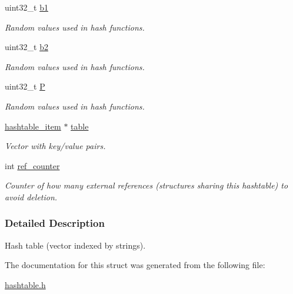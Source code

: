\begin{DoxyCompactItemize}
\mbox{\label{structhashtable__struct_a3d65fc5f5625a3c950ae177599c1a4dc}} 
uint32\+\_\+t \hyperlink{structhashtable__struct_a3d65fc5f5625a3c950ae177599c1a4dc}{b1}
\begin{DoxyCompactList}\small\item\em Random values used in hash functions. \end{DoxyCompactList}\item 
\mbox{\label{structhashtable__struct_a7c912d95360bc525d15b5a7cd7906ce3}} 
uint32\+\_\+t \hyperlink{structhashtable__struct_a7c912d95360bc525d15b5a7cd7906ce3}{b2}
\begin{DoxyCompactList}\small\item\em Random values used in hash functions. \end{DoxyCompactList}\item 
\mbox{\label{structhashtable__struct_af1b180f0885b6077b7eeb60fa8267058}} 
uint32\+\_\+t \hyperlink{structhashtable__struct_af1b180f0885b6077b7eeb60fa8267058}{P}
\begin{DoxyCompactList}\small\item\em Random values used in hash functions. \end{DoxyCompactList}\item 
\mbox{\label{structhashtable__struct_ae8753bc6e120a945558de12c7fc53fd6}} 
\hyperlink{structhashtable__item__struct}{hashtable\+\_\+item} $\ast$ \hyperlink{structhashtable__struct_ae8753bc6e120a945558de12c7fc53fd6}{table}
\begin{DoxyCompactList}\small\item\em Vector with key/value pairs. \end{DoxyCompactList}\item 
\mbox{\label{structhashtable__struct_a83abeb291046d5560c2e1612c70c86d0}} 
int \hyperlink{structhashtable__struct_a83abeb291046d5560c2e1612c70c86d0}{ref\+\_\+counter}
\begin{DoxyCompactList}\small\item\em Counter of how many external references (structures sharing this hashtable) to avoid deletion. \end{DoxyCompactList}\end{DoxyCompactItemize}


\subsubsection{Detailed Description}
Hash table (vector indexed by strings). 

The documentation for this struct was generated from the following file\+:\begin{DoxyCompactItemize}
\item 
\hyperlink{hashtable_8h}{hashtable.\+h}\end{DoxyCompactItemize}
